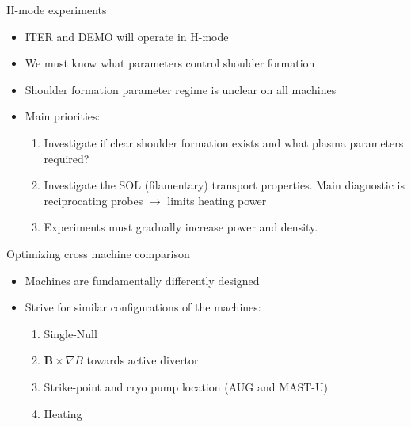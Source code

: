 \documentclass[10pt, compress]{beamer}
\begin{document}
\begin{frame}{H-mode experiments}
\begin{itemize}
	\item ITER and DEMO will operate in H-mode
	\item We must know what parameters control shoulder formation 
	\item Shoulder formation parameter regime is unclear on all machines
	\item Main priorities: 
	\begin{enumerate}
		\item Investigate if clear shoulder formation exists and what plasma parameters required? 
		\item Investigate the SOL (filamentary) transport properties. Main diagnostic is reciprocating probes $\rightarrow$ limits heating power
		\item Experiments must gradually increase power and density. 
	\end{enumerate}
\end{itemize}

\end{frame}


\begin{frame}{Optimizing cross machine comparison}
\begin{itemize}
	\item Machines are fundamentally differently designed
	\item Strive for similar configurations of the machines:
	\begin{enumerate} 
		\item Single-Null
		\item $\bm{B} \times \nabla B$ towards active divertor 
		\item Strike-point and cryo pump location (AUG and MAST-U)
		\item Heating 
	\end{enumerate}
\end{itemize} 


\end{frame}
\end{document}
